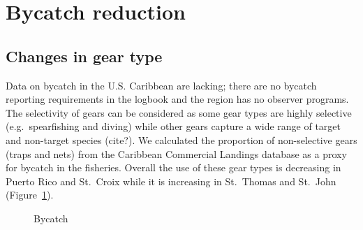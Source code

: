 \documentclass[
  letterpaper,
  oneside,
  open=any]{scrbook}
\begin{document}
\section{Bycatch reduction}\label{bycatch-reduction}

\subsection{Changes in gear type}\label{changes-in-gear-type}

Data on bycatch in the U.S. Caribbean are lacking; there are no bycatch
reporting requirements in the logbook and the region has no observer
programs. The selectivity of gears can be considered as some gear types
are highly selective (e.g.~spearfishing and diving) while other gears
capture a wide range of target and non-target species (cite?). We
calculated the proportion of non-selective gears (traps and nets) from
the Caribbean Commercial Landings database as a proxy for bycatch in the
fisheries. Overall the use of these gear types is decreasing in Puerto
Rico and St.~Croix while it is increasing in St.~Thomas and St.~John
(Figure~\ref{fig-bycatch}).

\begin{figure}


\caption{\label{fig-bycatch}Bycatch}

\end{figure}%
\end{document}
